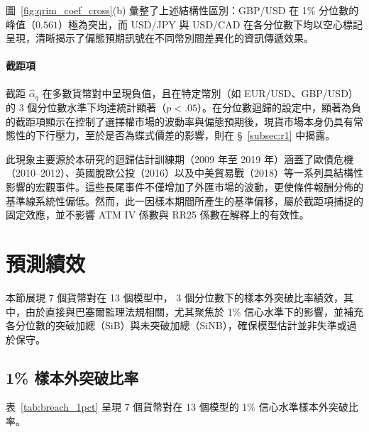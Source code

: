 圖~\ref{fig:qrim_coef_cross}(b) 彙整了上述結構性區別：GBP/USD 在 1\% 分位數的峰值（$0.561$）極為突出，而 USD/JPY 與 USD/CAD 在各分位數下均以空心標記呈現，清晰揭示了偏態預期訊號在不同幣別間差異化的資訊傳遞效果。

\paragraph{截距項}

截距 $\hat\alpha_q$ 在多數貨幣對中呈現負值，且在特定幣別（如 EUR/USD、GBP/USD）的 3 個分位數水準下均達統計顯著（$p < .05$）。在分位數迴歸的設定中，顯著為負的截距項顯示在控制了選擇權市場的波動率與偏態預期後，現貨市場本身仍具有常態性的下行壓力，至於是否為蝶式價差的影響，則在 \S\ \ref{subsec:r1} 中揭露。

此現象主要源於本研究的迴歸估計訓練期（2009 年至 2019 年）涵蓋了歐債危機（2010–2012）、英國脫歐公投（2016）以及中美貿易戰（2018）等一系列具結構性影響的宏觀事件。這些長尾事件不僅增加了外匯市場的波動，更使條件報酬分佈的基準線系統性偏低。然而，此一因樣本期間所產生的基準偏移，屬於截距項捕捉的固定效應，並不影響 ATM IV 係數與 RR25 係數在解釋上的有效性。


\section{預測績效}
\label{sec:perf_all}

本節展現 7 個貨幣對在 13 個模型中， 3 個分位數下的樣本外突破比率績效，其中，由於直接與巴塞爾監理法規相關，尤其聚焦於 1\% 信心水準下的影響，並補充各分位數的突破加總（SiB）與未突破加總（SiNB），確保模型估計並非失準或過於保守。

\subsection{1\% 樣本外突破比率}
\label{sec:perf_1pct}

表~\ref{tab:breach_1pct} 呈現 7 個貨幣對在 13 個模型的 1\% 信心水準樣本外突破比率。

